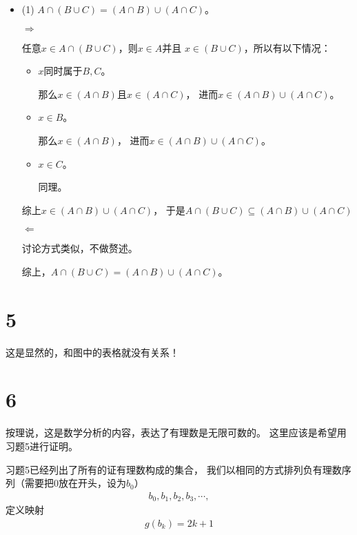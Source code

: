 \documentclass{article}
\begin{document}
\begin{itemize}
      \item (1) $A \cap (B \cup C) = (A \cap B) \cup (A \cap C)$。

            $\Rightarrow$

            任意$x \in A \cap (B \cup C)$，则$x \in A$并且
            $x \in (B \cup C)$，所以有以下情况：

            \begin{itemize}
                  \item $x$同时属于$B, C$。

                        那么$x \in (A \cap B)$且$x \in (A \cap C)$，
                        进而$x \in (A \cap B) \cup (A \cap C)$。

                  \item $x \in B$。

                        那么$x \in (A \cap B)$，
                        进而$x \in (A \cap B) \cup (A \cap C)$。

                  \item $x \in C$。

                        同理。

            \end{itemize}
            综上$x \in (A \cap B) \cup (A \cap C)$，
            于是$A \cap (B \cup C) \subseteq (A \cap B) \cup (A \cap C)$


            $\Leftarrow$

            讨论方式类似，不做赘述。

            综上，$A \cap (B \cup C) = (A \cap B) \cup (A \cap C)$。

\end{itemize}

\section*{5}

这是显然的，和图中的表格就没有关系！

\section*{6}

按理说，这是数学分析的内容，表达了有理数是无限可数的。
这里应该是希望用习题5进行证明。

习题5已经列出了所有的证有理数构成的集合，
我们以相同的方式排列负有理数序列（需要把$0$放在开头，设为$b_0$）
\begin{align*}
      b_0, b_1, b_2, b_3, \cdots,
\end{align*}
定义映射
\begin{align*}
      g(b_k) = 2k + 1
\end{align*}
\end{document}
